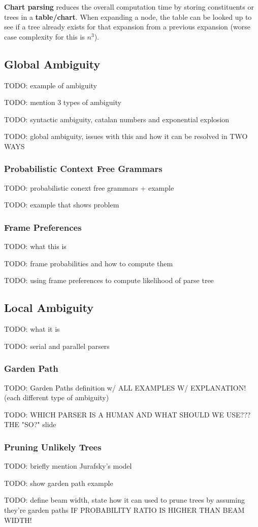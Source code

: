 \documentclass{article}
\begin{document}
\textbf{Chart parsing} reduces the overall computation time by storing constituents or trees in a \textbf{table/chart}. When expanding a node, the table can be looked up to see if a tree already exists for that expansion from a previous expansion (worse case complexity for this is $n^3$).

\subsection{Global Ambiguity}

TODO: example of ambiguity

TODO: mention 3 types of ambiguity

TODO: syntactic ambiguity, catalan numbers and exponential explosion

TODO: global ambiguity, issues with this and how it can be resolved in TWO WAYS

\subsubsection{Probabilistic Context Free Grammars}

TODO: probabilistic conext free grammars + example

TODO: example that shows problem

\subsubsection{Frame Preferences}

TODO: what this is

TODO: frame probabilities and how to compute them

TODO: using frame preferences to compute likelihood of parse tree

\subsection{Local Ambiguity}

TODO: what it is

TODO: serial and parallel parsers

\subsubsection{Garden Path}

TODO: Garden Paths definition w/ ALL EXAMPLES W/ EXPLANATION!
	(each different type of ambiguity)

TODO: WHICH PARSER IS A HUMAN AND WHAT SHOULD WE USE??? THE "SO?" slide

\subsubsection{Pruning Unlikely Trees}

TODO: briefly mention Jurafsky's model

TODO: show garden path example

TODO: define beam width, state how it can used to prune trees by assuming they're garden paths IF PROBABILITY RATIO IS HIGHER THAN BEAM WIDTH!
\end{document}
